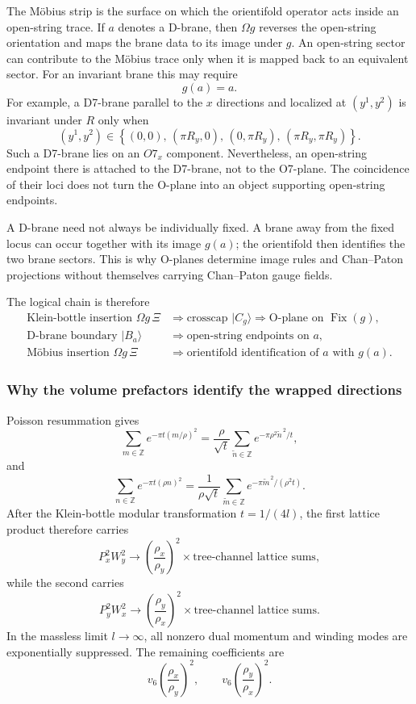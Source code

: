 \documentclass[
  10pt,
  a4paper,
  openany]{book}
\begin{document}
The Möbius strip is the surface on which the orientifold operator acts
inside an open-string trace. If \(a\) denotes a D-brane, then
\(\Omega g\) reverses the open-string orientation and maps the brane
data to its image under \(g\). An open-string sector can contribute to
the Möbius trace only when it is mapped back to an equivalent sector.
For an invariant brane this may require \[
g(a)=a.
\] For example, a D7-brane parallel to the \(x\) directions and
localized at \((y^1,y^2)\) is invariant under \(R\) only when \[
(y^1,y^2)
\in
\left\{
(0,0),\,
(\pi R_y,0),\,
(0,\pi R_y),\,
(\pi R_y,\pi R_y)
\right\}.
\] Such a D7-brane lies on an \(O7_x\) component. Nevertheless, an
open-string endpoint there is attached to the D7-brane, not to the
O7-plane. The coincidence of their loci does not turn the O-plane into
an object supporting open-string endpoints.

A D-brane need not always be individually fixed. A brane away from the
fixed locus can occur together with its image \(g(a)\); the orientifold
then identifies the two brane sectors. This is why O-planes determine
image rules and Chan--Paton projections without themselves carrying
Chan--Paton gauge fields.

The logical chain is therefore \[
\boxed{
\begin{aligned}
\text{Klein-bottle insertion }\Omega g\,\Xi
&\Longrightarrow
\text{crosscap }|C_g\rangle
\Longrightarrow
\text{O-plane on }\operatorname{Fix}(g),\\
\text{D-brane boundary }|B_a\rangle
&\Longrightarrow
\text{open-string endpoints on }a,\\
\text{Möbius insertion }\Omega g\,\Xi
&\Longrightarrow
\text{orientifold identification of }a\text{ with }g(a).
\end{aligned}
}
\]

\subsubsection{Why the volume prefactors identify the wrapped
directions}\label{why-the-volume-prefactors-identify-the-wrapped-directions}

Poisson resummation gives \[
\sum_{m\in\mathbb Z}
e^{-\pi t(m/\rho)^2}
=
\frac{\rho}{\sqrt t}
\sum_{\widetilde n\in\mathbb Z}
e^{-\pi\rho^2\widetilde n^{\,2}/t},
\] and \[
\sum_{n\in\mathbb Z}
e^{-\pi t(\rho n)^2}
=
\frac{1}{\rho\sqrt t}
\sum_{\widetilde m\in\mathbb Z}
e^{-\pi\widetilde m^{\,2}/(\rho^2t)}.
\] After the Klein-bottle modular transformation \(t=1/(4l)\), the first
lattice product therefore carries \[
P_x^2W_y^2
\longrightarrow
\left(\frac{\rho_x}{\rho_y}\right)^2
\times
\text{tree-channel lattice sums},
\] while the second carries \[
P_y^2W_x^2
\longrightarrow
\left(\frac{\rho_y}{\rho_x}\right)^2
\times
\text{tree-channel lattice sums}.
\] In the massless limit \(l\to\infty\), all nonzero dual momentum and
winding modes are exponentially suppressed. The remaining coefficients
are \[
v_6\left(\frac{\rho_x}{\rho_y}\right)^2,
\qquad
v_6\left(\frac{\rho_y}{\rho_x}\right)^2.
\]
\end{document}
